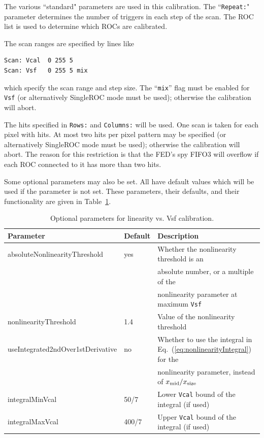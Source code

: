 The various ``standard" parameters are used in this calibration.  The
``\verb|Repeat:|" parameter determines the number of triggers in each step
of the scan.  The ROC list is used to determine which ROCs are calibrated.

The scan ranges are specified by lines like
\begin{verbatim}
Scan: Vcal  0 255 5
Scan: Vsf   0 255 5 mix
\end{verbatim}
which specify the scan range and step size.  The ``\verb|mix|'' flag must be enabled for \verb|Vsf| (or alternatively SingleROC mode must be used); otherwise the calibration will abort.

The hits specified in \verb|Rows:| and \verb|Columns:| will be
used.  One scan is taken for each pixel with hits.  At most two hits per pixel pattern may be specified (or alternatively SingleROC mode must be used); otherwise the calibration will abort.  The reason for this restriction is that the FED's spy FIFO3 will overflow if each ROC connected to it has more than two hits.

Some optional parameters may also be set.  All have default values which will
be used if the parameter is not set.  These parameters, their defaults, and
their functionality are given in Table~\ref{tab:LinearityVsVsfParameters}.

\begin{table}
\centering
\caption{Optional parameters for linearity vs. Vsf calibration.}
\label{tab:LinearityVsVsfParameters}
\begin{tabular}{l@{~~~~}l@{~~~~}l}
\hline
\hline
Parameter & Default & Description \\
\hline
absoluteNonlinearityThreshold     & yes   & Whether the nonlinearity threshold is an \\
                                  &       &   absolute number, or a multiple of the \\
                                  &       &   nonlinearity parameter at maximum \verb|Vsf| \\
nonlinearityThreshold             & 1.4   & Value of the nonlinearity threshold \\
useIntegrated2ndOver1stDerivative & no    & Whether to use the integral in Eq.~(\ref{eq:nonlinearityIntegral}) for the \\
                                  &       &   nonlinearity parameter, instead of $x_{\rm mid}/x_{\rm size}$ \\
integralMinVcal                   &  50/7 & Lower \verb|Vcal| bound of the integral (if used) \\
integralMaxVcal                   & 400/7 & Upper \verb|Vcal| bound of the integral (if used) \\
\hline
\hline
\end{tabular}
\end{table}


